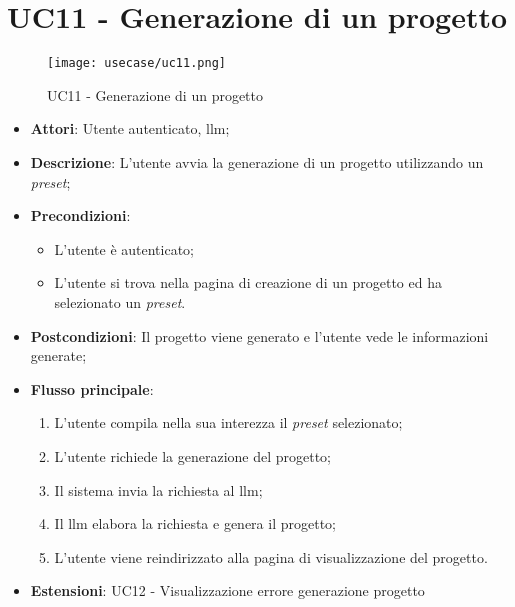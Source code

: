 \vspace{0.5cm}  
\section*{UC11 - Generazione di un progetto}
\begin{figure}[H]
    \centering
    \texttt{[image: usecase/uc11.png]}
    \caption{UC11 - Generazione di un progetto}
    \label{fig:uc11}
\end{figure}
\begin{itemize}
    \item \textbf{Attori}: Utente autenticato, \gls{llm};
    \item \textbf{Descrizione}: L'utente avvia la generazione di un progetto utilizzando un \textit{preset};
    \item \textbf{Precondizioni}: 
    \begin{itemize}
        \item L'utente è autenticato;
        \item L'utente si trova nella pagina di creazione di un progetto ed ha selezionato un \textit{preset}.
    \end{itemize}
    \item \textbf{Postcondizioni}: Il progetto viene generato e l'utente vede le informazioni generate;
    \item \textbf{Flusso principale}:
    \begin{enumerate}
        \item L'utente compila nella sua interezza il \textit{preset} selezionato;
        \item L'utente richiede la generazione del progetto;
        \item Il sistema invia la richiesta al \gls{llm};
        \item Il \gls{llm} elabora la richiesta e genera il progetto;
        \item L'utente viene reindirizzato alla pagina di visualizzazione del progetto.
    \end{enumerate}
    \item \textbf{Estensioni}: UC12 - Visualizzazione errore generazione progetto
\end{itemize}

\vspace{0.5cm}
